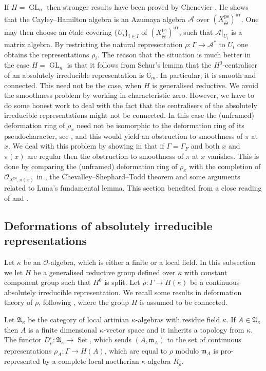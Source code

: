 \documentclass{amsart}
\theoremstyle{definition}
\theoremstyle{remark}
\DeclareMathOperator{\GL}{GL}
\DeclareMathOperator{\Set}{Set}
\newcommand{\mm}{\mathfrak m}
\newcommand{\OO}{\mathcal O}
\newcommand{\Gm}{\mathbb G_m}
\newcommand{\irr}{\mathrm{irr}}
\newcommand{\Thetabar}{\overline{\Theta}}
\newcommand{\ps}{\mathrm{ps}}
\begin{document}
 If $H=\GL_n$ then stronger results have been proved by Chenevier \cite{che_durham}. He shows
 that the Cayley--Hamilton algebra is an Azumaya
 algebra $\mathcal A$ over $(X^{\ps}_{\Thetabar})^{\irr}$. 
 One may then 
 choose an \'etale covering $\{U_i\}_{i\in I}$ of 
 $(X^{\ps}_{\Thetabar})^{\irr}$,
 such that $\mathcal A|_{U_i}$ is a matrix algebra.
 By restricting the natural representation
 $\rho: \Gamma \rightarrow \mathcal A^*$ to
 $U_i$ one obtains the representations $\rho_i$.  
 The reason that the situation is much better in 
 the case $H=\GL_n$ is that it follows from Schur's
 lemma that the $H^0$-centraliser of an absolutely irreducible representation is $\Gm$. In particular, 
 it is smooth and connected. This need not be the case, when $H$ is generalised reductive. We avoid the smoothness problem by working in characteristic zero. However, we have to do some honest work to deal with the fact that the centralisers of the absolutely irreducible representations might not be connected. In this case the (unframed) deformation ring of $\rho_x$ need not 
 be isomorphic to the deformation ring of its pseudocharacter, see , and this would yield an obstruction to smoothness of $\pi$ at $x$. We deal with this problem by showing in  that 
 if $\Gamma=\Gamma_F$ and both $x$ and $\pi(x)$ are regular then the obstruction to smoothness of  
 $\pi$ at $x$ vanishes. This is done by 
 comparing the (unframed) deformation ring of $\rho_x$ with the completion of $\OO_{X^{\ps}, \pi(x)}$ in , the Chevalley--Shephard--Todd theorem and some arguments
 related to Luna's fundamental lemma. This section  benefited from a close reading of \cite[Theorem 4.1]{BHKT} and \cite[Theorem 53]{sikora}.

 

\subsection{Deformations of absolutely irreducible representations}

Let $\kappa$ be an $\OO$-algebra, which is either a finite or a local field. 
In this subsection we let $H$ be a generalised reductive group defined over $\kappa$ with constant
component group such that $H^0$ is split.
Let $\rho: \Gamma \rightarrow H(\kappa)$ 
be a continuous absolutely irreducible representation. We recall some results in deformation theory of $\rho$, following \cite{BHKT}, where the group $H$ is assumed to be connected. 

Let $\mathfrak A_{\kappa}$ be the category of local artinian $\kappa$-algebras with residue field $\kappa$.
If $A\in \mathfrak A_{\kappa}$ then $A$ is a finite dimensional $\kappa$-vector space and it inherits a topology from $\kappa$.
The functor 
$D^{\square}_{\rho}: 
\mathfrak A_{\kappa}
\rightarrow \Set$, which 
sends $(A, \mm_A)$ to the set 
of continuous representations 
$\rho_A: \Gamma\rightarrow H(A)$,
which are equal to $\rho$ modulo
$\mm_A$ is pro-represented by a
complete local noetherian
$\kappa$-algebra
$R^{\square}_{\rho}$.
\end{document}
